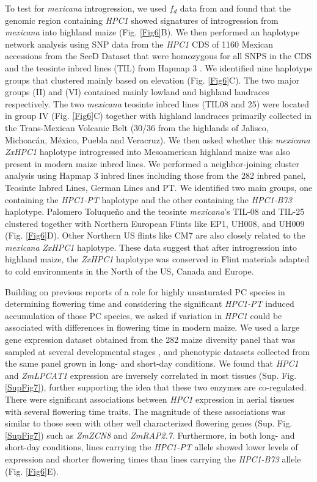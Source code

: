 \documentclass[9pt,twocolumn,twoside,lineno]{BioRxiv}
\begin{document}
To test for \textit{mexicana} introgression, we used \(f_d\) data from \cite{Gonzalez-Segovia2019-jy} and found that the genomic region containing \textit{HPC1} showed signatures of introgression from \textit{mexicana} into highland maize (Fig. \ref{Fig6}B).
We then performed an haplotype network analysis using SNP data from the \textit{HPC1} CDS of 1160 Mexican accessions from the SeeD Dataset \cite{Romero_Navarro2017-cn} that were homozygous for all SNPS in the CDS and the teosinte inbred lines (TIL) from Hapmap 3 \cite{Bukowski2017-ng}.   
We identified nine haplotype groups that clustered mainly based on elevation (Fig. \ref{Fig6}C). 
The two major groups (II) and (VI) contained mainly lowland and highland landraces respectively. 
The two \textit{mexicana} teosinte inbred lines (TIL08 and 25) were located in group IV  (Fig. \ref{Fig6}C) together with highland landraces primarily collected in the Trans-Mexican Volcanic Belt (30/36 from the highlands of Jalisco, Michoacán, México, Puebla and Veracruz).
We then asked whether this \textit{mexicana} \textit{ZxHPC1} haplotype introgressed into Mesoamerican highland maize was also present in modern maize inbred lines. 
We performed a neighbor-joining cluster analysis using Hapmap 3 inbred lines including those from the 282 inbred panel, Teosinte Inbred Lines, German Lines and PT. 
We identified two main groups, one containing the \textit{HPC1-PT} haplotype and the other containing the \textit{HPC1-B73} haplotype.
Palomero Toluqueño and the teosinte \textit{mexicana}'s TIL-08 and TIL-25 clustered together with Northern European Flints like EP1, UH008, and UH009 (Fig. \ref{Fig6}D). 
Other Northern US flints like CM7 are also closely related to the \textit{mexicana} \textit{ZxHPC1} haplotype. 
These data suggest that after introgression into highland maize, the \textit{ZxHPC1} haplotype was conserved in Flint materials adapted to cold environments in the North of the US, Canada and Europe. 

Building on previous reports of a role for highly unsaturated PC species in determining flowering time \cite{Nakamura2014-qf, Riedelsheimer2013-bd} and considering the significant \textit{HPC1-PT} induced accumulation of those PC species, we asked if variation in \textit{HPC1} could be associated with differences in flowering time in modern maize. 
We used a large gene expression dataset obtained from the 282 maize diversity panel that was sampled at several developmental stages \cite{Kremling2018-gn}, and phenotypic datasets collected from the same panel grown in long- and short-day conditions.
We found that \textit{HPC1} and \textit{ZmLPCAT1} expression are inversely correlated in most tissues (Sup. Fig. \ref{SupFig7}), further supporting the idea that these two enzymes are co-regulated. 
There were significant associations between \textit{HPC1} expression in aerial tissues with several flowering time traits.
The magnitude of these associations was similar to those seen with other well characterized flowering genes (Sup. Fig. \ref{SupFig7}) such as \textit{ZmZCN8}  and \textit{ZmRAP2.7}.  
Furthermore, in both long- and short-day conditions, lines carrying the \textit{HPC1-PT} allele showed lower levels of expression and shorter flowering times than lines carrying the \textit{HPC1-B73} allele  (Fig. \ref{Fig6}E). 
\end{document}
